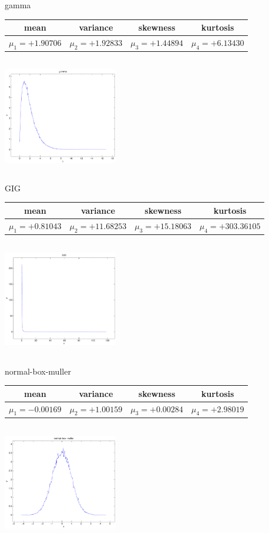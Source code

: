 \documentclass[9pt]{article}
\theoremstyle{plain}
\theoremstyle{definition}
\theoremstyle{remark}
\numberwithin{equation}{section}
\begin{document}
\newpage
gamma \begin{tabular}{|c|c|c|c|}  mean & variance & skewness & kurtosis \\  \hline
$\mu_1 = +1.90706$ & $\mu_2 = +1.92833$ & $\mu_3 = +1.44894$ & $\mu_4 =+6.13430$ \\
\end{tabular}

\includegraphics[width=5cm,height=5cm]{gamma.pdf}

GIG \begin{tabular}{|c|c|c|c|}  mean & variance & skewness & kurtosis \\  \hline
$\mu_1 = +0.81043$ & $\mu_2 = +11.68253$ & $\mu_3 = +15.18063$ & $\mu_4 =+303.36105$ \\
\end{tabular}

\includegraphics[width=5cm,height=5cm]{GIG.pdf}

normal-box-muller \begin{tabular}{|c|c|c|c|}  mean & variance & skewness & kurtosis \\  \hline
$\mu_1 = -0.00169$ & $\mu_2 = +1.00159$ & $\mu_3 = +0.00284$ & $\mu_4 =+2.98019$ \\
\end{tabular}

\includegraphics[width=5cm,height=5cm]{normal-box-muller.pdf}
\end{document}
